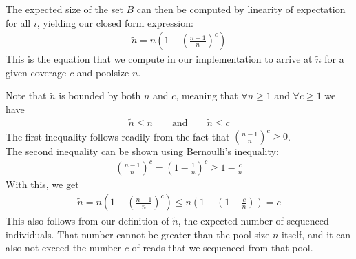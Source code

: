 \documentclass[letterpaper,fontsize=9pt,DIV=12]{scrartcl}
\newcounter{todo}
\newcommand\todo[1]{}
\newcommand{\coverage}{c}
\begin{document}
The expected size of the set $B$ can then be computed by linearity of expectation for all $i$,
yielding our closed form expression:
%
%
\begin{align}
    \label{eq:NTildeClosedForm}
    \tilde{n} = n \left( 1 - \left( \frac{n-1}{n} \right)^\coverage \right)
\end{align}
%
This is the equation that we compute in our implementation to arrive at $\tilde{n}$ for a given coverage $\coverage$ and poolsize $n$.

Note that $\tilde{n}$ is bounded by both $n$ and $c$, meaning that $\forall n \geq 1$ and $\forall c \geq 1$ we have
\begin{align}
    \label{eq:NTildeBounds}
     \tilde{n} \leq n \qquad\mbox{and}\qquad \tilde{n} \leq c
\end{align}
The first inequality follows readily from the fact that $(\frac{n-1}{n})^c \ge 0$. \\
The second inequality can be shown using Bernoulli's inequality:
\begin{align}
     \left( \frac{n-1}{n} \right)^c = \left(1 - \frac{1}{n} \right)^c \geq 1 - \frac{c}{n}
\end{align}
With this, we get
\begin{align}
    \tilde{n} = n \left( 1 - \left( \frac{n-1}{n} \right)^\coverage \right) \leq n \left( 1 - \left( 1 - \frac{c}{n} \right) \right) = c
\end{align}
This also follows from our definition of $\tilde{n}$, the expected number of sequenced individuals. That number cannot be greater than the pool size $n$ itself, and it can also not exceed the number $c$ of reads that we sequenced from that pool.


\todo{UNRESOLVED ISSUE: This is computed using the coverage $\coverage$ in the above equations (and in the PoPoolation equations), but seems to be called with $b$ (min coverage) in their code (and in mine). Jeff, is that yet another bug (number three then, on top of the two already mentioned two sections below) that they introduced in their code? it seems weird to compute this based on the min coverage, than the actual coverage at the site.  JPS: I'm actually not totally sure what the PoPoolation people are doing here.  I guess they're plugging an estimate of $n$ into the f alpha and beta, which is fine, but could be biased.  My guess is that you would want to use $\coverage$ and not $b$, but as I said I'm not totally sure what they're doing here. Update 1/4/23 -- I think that they should be using $c$ here and not $b$. But, I should say that just plugging in an estimate for $n$ in the Achaz equations will result in some bias as equations 20, 21, and 22 are nonlinear in n.}
\end{document}
